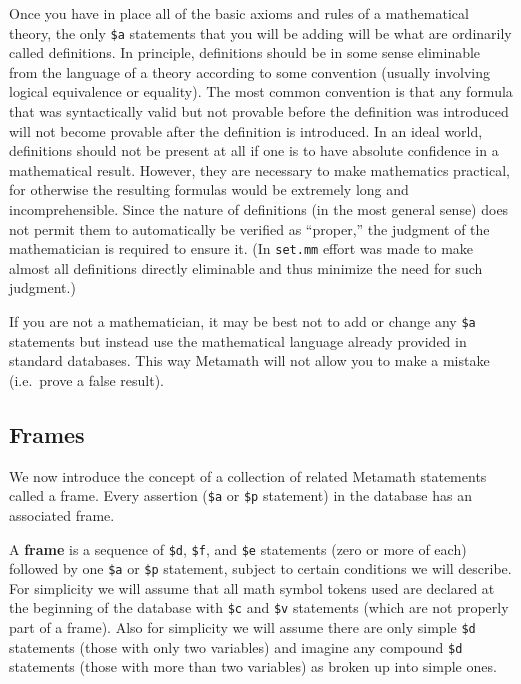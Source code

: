 Once you have in place all of the basic axioms and
rules of a mathematical theory, the only \texttt{\$a} statements that
you will be adding will be what are ordinarily called definitions.  In
principle, definitions should be in some sense eliminable from the language of
a theory according to some convention (usually involving logical equivalence
or equality).  The most common convention is that any formula that was
syntactically valid but not provable before the definition was introduced will
not become provable after the definition is introduced.  In an ideal world,
definitions should not be present at all if one is to have absolute confidence
in a mathematical result.  However, they are necessary to make
mathematics practical, for otherwise the resulting formulas would be
extremely long and incomprehensible.  Since the nature of definitions (in the
most general sense) does not permit them to automatically be verified as
``proper,'' the judgment of
the mathematician is required to ensure it.  (In \texttt{set.mm} effort was made
to make almost all definitions directly eliminable and thus minimize the need
for such judgment.)

If you are not a mathematician, it may be best not to add or change any
\texttt{\$a} statements but instead use
the mathematical language already provided in standard databases.  This
way Metamath will not allow you to make a mistake (i.e.\ prove a false
result).


\subsection{Frames}\label{frames}

We now introduce the concept of a collection of related Metamath statements
called a frame.  Every assertion (\texttt{\$a} or \texttt{\$p} statement) in the database has
an associated frame.

A {\bf frame} is a sequence of \texttt{\$d}, \texttt{\$f},
and \texttt{\$e} statements (zero or more of each) followed by one
\texttt{\$a} or \texttt{\$p} statement, subject to certain conditions we
will describe.  For simplicity we will assume that all math symbol
tokens used are declared at the beginning of the database with
\texttt{\$c} and \texttt{\$v} statements (which are not properly part of
a frame).  Also for simplicity we will assume there are only simple
\texttt{\$d} statements (those with only two variables) and imagine any
compound \texttt{\$d} statements (those with more than two variables) as
broken up into simple ones.

